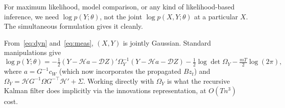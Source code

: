\documentclass[11pt]{article}
\begin{document}
For maximum likelihood, model comparison, or any kind of likelihood-based
inference, we need $\log p(Y;\theta)$, not the joint $\log p(X,Y;\theta)$
at a particular $X$.  The simultaneous formulation gives it cleanly.

From~\eqref{eq:dyn} and~\eqref{eq:meas}, $(X,Y)$ is jointly Gaussian.
Standard manipulations give
\begin{equation}
\log p(Y;\theta) = -\tfrac12(Y-\mathcal H a-\mathcal D Z)'\Omega_Y^{-1}(Y-\mathcal H a-\mathcal D Z)
                   -\tfrac12 \log\det \Omega_Y
                   -\tfrac{mT}{2}\log(2\pi),
\end{equation}
where $a=G^{-1}c_W$ (which now incorporates the propagated $Bz_t$) and
$\Omega_Y=\mathcal H G^{-1}\Omega G^{-\top}\mathcal H'+\Sigma$.  Working
directly with $\Omega_Y$ is what the recursive Kalman filter does
implicitly via the innovations representation, at $O(Tn^3)$ cost.
\end{document}
